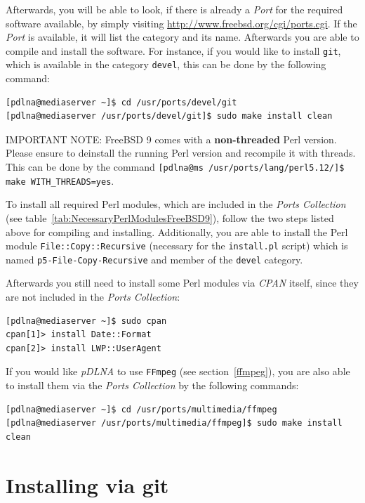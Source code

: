 \documentclass[a4paper,oneside,10pt]{report}
\newenvironment{colframeimportantnote}{%
  \begin{Sbox}
    \begin{minipage}{.99\columnwidth}
}{%
  \end{minipage}
  \end{Sbox}
  \begin{center}
    \fcolorbox{black}{Orange}{\TheSbox}
  \end{center}
}
\begin{document}
Afterwards, you will be able to look, if there is already a {\em Port} for the required software available, by simply visiting \url{http://www.freebsd.org/cgi/ports.cgi}. If the {\em Port} is available, it will list the category and its name. Afterwards you are able to compile and install the software. For instance, if you would like to install \verb|git|, which is available in the category \verb|devel|, this can be done by the following command:
\begin{lstlisting}
[pdlna@mediaserver ~]$ cd /usr/ports/devel/git
[pdlna@mediaserver /usr/ports/devel/git]$ sudo make install clean
\end{lstlisting}

\begin{colframeimportantnote}
\textsc{IMPORTANT NOTE:} FreeBSD 9 comes with a \textbf{non-threaded} Perl version. Please ensure to deinstall the running Perl version and recompile it with threads. This can be done by the command \verb|[pdlna@ms /usr/ports/lang/perl5.12/]$ make WITH_THREADS=yes|.
\end{colframeimportantnote}

To install all required Perl modules, which are included in the {\em Ports Collection} (see table~\ref{tab:NecessaryPerlModulesFreeBSD9}), follow the two steps listed above for compiling and installing. Additionally, you are able to install the Perl module \verb|File::Copy::Recursive| (necessary for the \verb|install.pl| script) which is named \verb|p5-File-Copy-Recursive| and member of the \verb|devel| category.

Afterwards you still need to install some Perl modules via {\em CPAN} itself, since they are not included in the {\em Ports Collection}:
\begin{lstlisting}
[pdlna@mediaserver ~]$ sudo cpan
cpan[1]> install Date::Format
cpan[2]> install LWP::UserAgent
\end{lstlisting}

If you would like {\em pDLNA} to use \verb|FFmpeg| (see section~\ref{ffmpeg}), you are also able to install them via the {\em Ports Collection} by the following commands:
\begin{lstlisting}
[pdlna@mediaserver ~]$ cd /usr/ports/multimedia/ffmpeg
[pdlna@mediaserver /usr/ports/multimedia/ffmpeg]$ sudo make install clean
\end{lstlisting}

\section{Installing via git}
\label{install-git}
\end{document}
